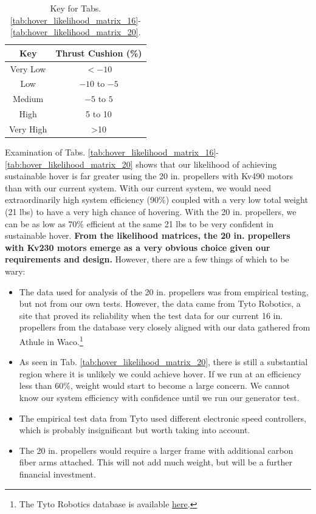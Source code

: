 \documentclass{article}
\begin{document}
\begin{table}[h]
    \centering
    \begin{tabular}{|c|c|}
        \hline
        \rowcolor{lightgray} 
        \textbf{Key} & \textbf{Thrust Cushion (\%)} \\
        \hline
        \cellcolor{red!80} Very Low &  $<-10$ \\
        \hline
        \cellcolor{red!20} Low & $-10$ to $-5$ \\
        \hline
        \cellcolor{yellow!60} Medium & $-5$ to $5$ \\
        \hline
        \cellcolor{ForestGreen!40} High & 5 to 10 \\
        \hline
        \cellcolor{ForestGreen!80} Very High & >10 \\
        \hline
    \end{tabular}
    \caption{Key for Tabs. \ref{tab:hover_likelihood_matrix_16}-\ref{tab:hover_likelihood_matrix_20}.}
    \label{tab:key_likelihood_matrix}
\end{table}

Examination of Tabs. \ref{tab:hover_likelihood_matrix_16}-\ref{tab:hover_likelihood_matrix_20} shows that our likelihood of achieving sustainable hover is far greater using the 20 in. propellers with Kv490 motors than with our current system. With our current system, we would need extraordinarily high system efficiency (90\%) coupled with a very low total weight (21 lbs) to have a very high chance of hovering. With the 20 in. propellers, we can be as low as 70\% efficient at the same 21 lbs to be very confident in sustainable hover. \textbf{From the likelihood matrices, the 20 in. propellers with Kv230 motors emerge as a very obvious choice given our requirements and design.} However, there are a few things of which to be wary:
\begin{itemize}
    \item The data used for analysis of the 20 in. propellers was from empirical testing, but not from our own tests. However, the data came from Tyto Robotics, a site that proved its reliability when the test data for our current 16 in. propellers from the database very closely aligned with our data gathered from Athule in Waco.\footnote{The Tyto Robotics database is available \href{https://database.tytorobotics.com/}{here}.}
    \item As seen in Tab. \ref{tab:hover_likelihood_matrix_20}, there is still a substantial region where it is unlikely we could achieve hover. If we run at an efficiency less than 60\%, weight would start to become a large concern. We cannot know our system efficiency with confidence until we run our generator test.
    \item The empirical test data from Tyto used different electronic speed controllers, which is probably insignificant but worth taking into account.
    \item The 20 in. propellers would require a larger frame with additional carbon fiber arms attached. This will not add much weight, but will be a further financial investment.
\end{itemize}
\end{document}
